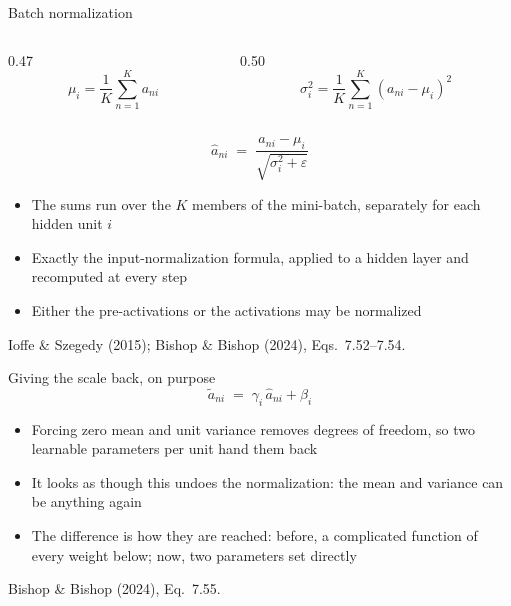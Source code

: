 \documentclass[aspectratio=169, 11pt]{beamer}
\newcommand{\srcline}[1]{%
  \par\vspace{0.25em}%
  {\scriptsize\color{mcMuted}\hfill #1\par}}
\begin{document}
\begin{frame}{Batch normalization}
  \vspace{-0.55em}
  \begin{columns}[T, onlytextwidth]
    \begin{column}{0.47\textwidth}
      \[ \mu_i = \frac{1}{K}\sum_{n=1}^{K} a_{ni} \]
    \end{column}
    \begin{column}{0.50\textwidth}
      \[ \sigma_i^2 = \frac{1}{K}\sum_{n=1}^{K}(a_{ni} - \mu_i)^2 \]
    \end{column}
  \end{columns}
  \vspace{-0.6em}
  \[
    \hat{a}_{ni} \;=\; \frac{a_{ni} - \mu_i}{\sqrt{\sigma_i^2 +
      \varepsilon}}
  \]
  \vspace{-0.7em}
  \begin{itemize}\itemsep0.28em
    \item The sums run over the $K$ members of the \alert{mini-batch},
          separately for each hidden unit $i$
    \item Exactly the input-normalization formula, applied to a hidden
          layer and recomputed at every step
    \item Either the pre-activations or the activations may be
          normalized
  \end{itemize}
  \srcline{Ioffe \& Szegedy (2015); Bishop \& Bishop (2024),
  Eqs.~7.52--7.54.}
\end{frame}

\begin{frame}{Giving the scale back, on purpose}
  \vspace{-0.35em}
  \[
    \tilde{a}_{ni} \;=\; \gamma_i\, \hat{a}_{ni} + \beta_i
  \]
  \vspace{-0.85em}
  \begin{itemize}\itemsep0.26em
    \item Forcing zero mean and unit variance removes degrees of
          freedom, so two learnable parameters per unit hand them back
    \item It looks as though this undoes the normalization: the mean and
          variance can be anything again
    \item The difference is \alert{how they are reached}: before, a
          complicated function of every weight below; now, two
          parameters set directly
  \end{itemize}
  \srcline{Bishop \& Bishop (2024), Eq.~7.55.}
\end{frame}
\end{document}
